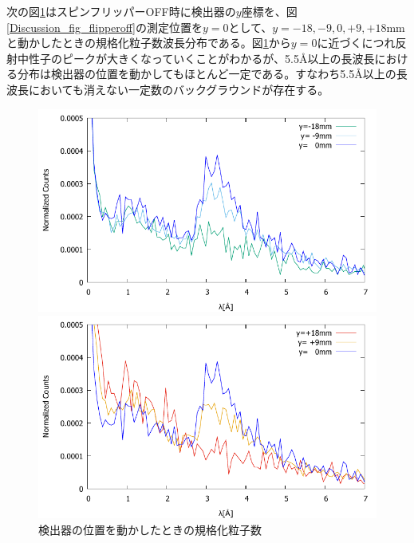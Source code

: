 次の図\ref{Discussion_fig_detectormove}はスピンフリッパーOFF時に検出器の$y$座標を、図\ref{Discussion_fig_flipperoff}の測定位置を$y=0$として、$y=-18,-9,0,+9,+18$mmと動かしたときの規格化粒子数波長分布である。図\ref{Discussion_fig_detectormove}から$y=0$に近づくにつれ反射中性子のピークが大きくなっていくことがわかるが、5.5\AA 以上の長波長における分布は検出器の位置を動かしてもほとんど一定である。すなわち5.5\AA 以上の長波長においても消えない一定数のバックグラウンドが存在する。
\begin{figure}[h]
\begin{minipage}{0.5\hsize}
\centering
\includegraphics[width=\hsize]{discussion/BG/flippermove1.pdf}
\end{minipage}
\begin{minipage}{0.5\hsize}
\centering
\includegraphics[width=\hsize]{discussion/BG/flippermove2.pdf}
\end{minipage}
\caption{検出器の位置を動かしたときの規格化粒子数}\label{Discussion_fig_detectormove}
\end{figure}


